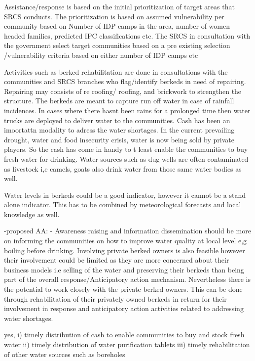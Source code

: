 Assistance/response is based on the initial prioritization of target areas that SRCS conducts. The prioritization is based on assumed vulnerability per community based on Number of IDP camps in the area, number of women headed families, predicted IPC classifications etc.
The SRCS in consultation with the government select target communities based on a pre existing selection /vulnerability criteria based on either number of IDP camps etc


Activities such as berked rehabilitation are done in consultations with the communities and SRCS branches who flag/identify berkeds in need of repairing. Repairing may consists of re roofing/ roofing, and brickwork to strengthen the structure. The berkeds are meant to capture run off water in case of rainfall incidences. In cases where there hasnt been rains for a prolonged time then water trucks are deployed to deliver water to the communities. Cash has been an imoortattn modality to adress the water shortages. In the current prevailing drought, water and food insecurity crisis, water is now being sold by private players. So the cash has come in handy to t least enable the communities to buy fresh water for drinking. Water sources such as dug wells are often contaminated as livestock i,e camels, goats also drink water from those same water bodies as well.

Water levels in berkeds could be a good indicator, however it cannot be a stand alone indicator. This has to be combined by meteorological forecasts and local knowledge as well.

-proposed AA:
-	Awareness raising and information dissemination should be more on informing the communities on how to improve water quality at local level e,g boiling before drinking. Involving private berked owners is also feasible however their involvement could be limited as they are more concerned about their business models i.e selling of the water and preserving their berkeds than being part of the overall response/Anticipatory action mechanism. Nevertheless there is the potential to work closely with the private berked owners. This can be done through rehabilitation of their privately owned berkeds in return for their involvement in response and anticipatory action activities related to addressing water shortages.

yes, i) timely distribution of cash to enable communities to buy and stock fresh water
ii) timely distribution of water purification tablets
iii) timely rehabilitation of other water sources such as boreholes

